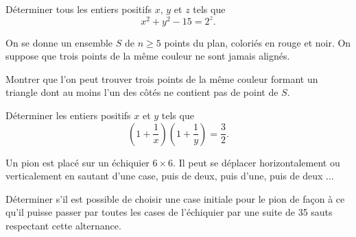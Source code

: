 

\begin{exo}
	Déterminer tous les entiers positifs $x$, $y$ et $z$ tels que
	\[x^2+ y^2 - 15 = 2^z.\]
\end{exo}



\begin{exo}
	On se donne un ensemble $S$ de $n \geq 5$ points du plan, coloriés en rouge et noir.
	On suppose que trois points de la même couleur ne sont jamais alignés. 
	
	Montrer que l'on peut trouver trois points de la même couleur formant un triangle dont au moins l'un des côtés ne contient pas de point de $S$.
\end{exo}

\begin{exo}{}
	Déterminer les entiers positifs $x$ et $y$ tels que
	\[\left( 1 + \frac{1}{x}\right) \left(1 + \frac{1}{y} \right) = \frac{3}{2}.\]
\end{exo}


\begin{exo}
	Un pion est placé sur un échiquier $6\times6$. Il peut se déplacer horizontalement ou verticalement en sautant d'une case, puis de deux, puis d'une, puis de deux $\ldots$
	
	Déterminer s'il est possible de choisir une case initiale pour le pion de façon à ce qu'il puisse passer par toutes les cases de l'échiquier par une suite de 35 sauts respectant cette alternance.
\end{exo}


\bigskip

